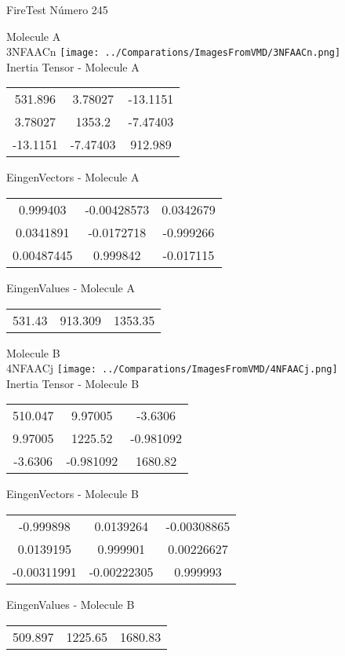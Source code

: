 \vtab[-2cm]
\begin{center}
{\large FireTest \tab Número 245}
\end{center}
\begin{multicols}{2}
\begin{center}

Molecule A \\ 
3NFAACn
\texttt{[image: ../Comparations/ImagesFromVMD/3NFAACn.png]}
\\
Inertia Tensor - Molecule A \\
\vtab

\begin{tabular}{|c c c|}
531.896	 & 	3.78027	 & 	-13.1151	 \\
3.78027	 & 	1353.2	 & 	-7.47403	 \\
-13.1151	 & 	-7.47403	 & 	912.989
\end{tabular}

\vtab
 EingenVectors - Molecule A     \\
\vtab
\begin{tabular}{|c c c|}
0.999403	 & 	-0.00428573	 & 	0.0342679	 \\
0.0341891	 & 	-0.0172718	 & 	-0.999266	 \\
0.00487445	 & 	0.999842	 & 	-0.017115
\end{tabular}

\vtab
 EingenValues - Molecule A     \\
\vtab
\begin{tabular}{|c c c|}
531.43	 & 	913.309	 & 	1353.35	 \\
\end{tabular}
\columnbreak

Molecule B \\ 
4NFAACj
\texttt{[image: ../Comparations/ImagesFromVMD/4NFAACj.png]}
\\
Inertia Tensor - Molecule B \\
\vtab

\begin{tabular}{|c c c|}
510.047	 & 	9.97005	 & 	-3.6306	 \\
9.97005	 & 	1225.52	 & 	-0.981092	 \\
-3.6306	 & 	-0.981092	 & 	1680.82
\end{tabular}

\vtab
 EingenVectors - Molecule B     \\
\vtab
\begin{tabular}{|c c c|}
-0.999898	 & 	0.0139264	 & 	-0.00308865	 \\
0.0139195	 & 	0.999901	 & 	0.00226627	 \\
-0.00311991	 & 	-0.00222305	 & 	0.999993
\end{tabular}

\vtab
 EingenValues - Molecule B     \\
\vtab
\begin{tabular}{|c c c|}
509.897	 & 	1225.65	 & 	1680.83	 \\
\end{tabular}

\end{center}
\end{multicols}
